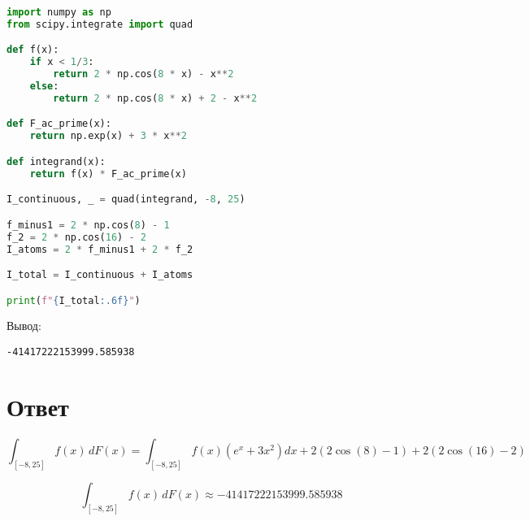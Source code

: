 \documentclass{article}
\begin{document}
\begin{lstlisting}[language=Python, basicstyle=\ttfamily\small, frame=single]
import numpy as np
from scipy.integrate import quad

def f(x):
    if x < 1/3:
        return 2 * np.cos(8 * x) - x**2
    else:
        return 2 * np.cos(8 * x) + 2 - x**2

def F_ac_prime(x):
    return np.exp(x) + 3 * x**2

def integrand(x):
    return f(x) * F_ac_prime(x)

I_continuous, _ = quad(integrand, -8, 25)

f_minus1 = 2 * np.cos(8) - 1
f_2 = 2 * np.cos(16) - 2
I_atoms = 2 * f_minus1 + 2 * f_2

I_total = I_continuous + I_atoms

print(f"{I_total:.6f}")
\end{lstlisting}

Вывод:
\begin{verbatim}
-41417222153999.585938
\end{verbatim}

\section{Ответ}
\[
\int_{[-8, 25]} f(x) \, dF(x) =
\int_{[-8, 25]} f(x)(e^x + 3x^2) dx + 2(2 \cos(8) - 1) + 2(2 \cos(16) - 2)
\]

\[
\int_{[-8, 25]} f(x) \, dF(x) \approx -41417222153999.585938
\]
\end{document}
